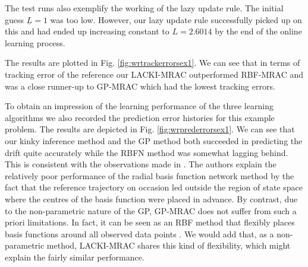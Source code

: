 The test runs also exemplify the working of the lazy update rule.
The initial guess $\underline L=1$ was too low. However, our lazy update rule successfully picked up on this and had ended up increasing constant to $L=2.6014$ by the end of the online learning process.



%
%
\begin{figure*}
        \centering
   \caption{Tracking error comparison of first example.}
	 \label{fig:wrtrackerrorsex1}
\end{figure*}	   

The results are plotted in Fig. \ref{fig:wrtrackerrorsex1}. 
We can see that in terms of tracking error of the reference our LACKI-MRAC outperformed RBF-MRAC and was a close runner-up to GP-MRAC which had the lowest tracking errors.  

%
To obtain an impression of the learning performance of the three learning algorithms we also recorded the prediction error histories for this example problem. The results are depicted in Fig. \ref{fig:wrprederrorsex1}. We can see that our kinky inference method and the GP method both succeeded in predicting the drift quite accurately while the RBFN method was somewhat lagging behind.
This is consistent with the observations made in \cite{Chowdhary2013,ChowdharyCDC2013}. The authors explain the relatively poor performance of the radial basis function network method by the fact that the reference trajectory on occasion led outside the region of state space where the centres of the basis function were placed in advance. By contrast, due to the non-parametric nature of the GP, GP-MRAC does not suffer from such a priori limitations. In fact, it can be seen as an RBF method that flexibly places basis functions around all observed data points \cite{GPbook:2006}. We would add that, as a non-parametric method, LACKI-MRAC shares this kind of flexibility, which might explain the fairly similar performance. 

